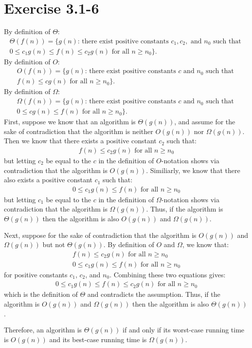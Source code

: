 \documentclass{article}
\begin{document}
\section*{Exercise 3.1-6}

By definition of $\Theta$:
\begin{eqnarray*}
	\Theta(f(n)) = \{g(n) \text{: there exist positive constants } c_1, c_2, \text{ and } n_0 \text{ such that } \\
	0 \leq c_1 g(n) \leq f(n) \leq c_2 g(n) \text{ for all } n \geq n_0\}.
\end{eqnarray*}
By definition of $O$:
\begin{eqnarray*}
	O(f(n)) = \{g(n) \text{: there exist positive constants } c \text{ and } n_0 \text{ such that } \\
	f(n) \leq c g(n) \text{ for all } n \geq n_0\}.
\end{eqnarray*}
By definition of $\Omega$:
\begin{eqnarray*}
	\Omega(f(n)) = \{g(n) \text{: there exist positive constants } c \text{ and } n_0 \text{ such that } \\
	0 \leq c g(n) \leq f(n) \text{ for all } n \geq n_0\}.
\end{eqnarray*}
First, suppose we know that an algorithm is $\Theta(g(n))$, and assume for the sake of contradiction that the algorithm is neither $O(g(n))$ nor $\Omega(g(n))$. Then we know that there exists a positive constant $c_2$ such that:
\begin{eqnarray*}
	f(n) \leq c_2 g(n) \text{ for all } n \geq n_0
\end{eqnarray*}
but letting $c_2$ be equal to the $c$ in the definition of $O$-notation shows via contradiction that the algorithm is $O(g(n))$. Similiarly, we know that there also exists a positive constant $c_1$ such that:
\begin{eqnarray*}
	0 \leq c_1 g(n) \leq f(n) \text{ for all } n \geq n_0
\end{eqnarray*}
but letting $c_1$ be equal to the $c$ in the definition of $\Omega$-notation shows via contradiction that the algorithm is $\Omega(g(n))$. Thus, if the algorithm is $\Theta(g(n))$ then the algorithm is also $O(g(n))$ and $\Omega(g(n))$.

Next, suppose for the sake of contradiction that the algorithm is $O(g(n))$ and $\Omega(g(n))$ but not $\Theta(g(n))$. By definition of $O$ and $\Omega$, we know that:
\begin{eqnarray*}
	f(n) \leq c_2 g(n) \text{ for all } n \geq n_0 \\
	0 \leq c_1 g(n) \leq f(n) \text{ for all } n \geq n_0
\end{eqnarray*}
for positive constants $c_1$, $c_2$, and $n_0$. Combining these two equations gives:
\begin{eqnarray*}
	0 \leq c_1 g(n) \leq f(n) \leq c_2 g(n) \text{ for all } n \geq n_0
\end{eqnarray*}
which is the definition of $\Theta$ and contradicts the assumption. Thus, if the algorithm is $O(g(n))$ and $\Omega(g(n))$ then the algorithm is also $\Theta(g(n))$.

Therefore, an algorithm is $\Theta(g(n))$ if and only if its worst-case running time is $O(g(n))$ and its best-case running time is $\Omega(g(n))$.
\end{document}
